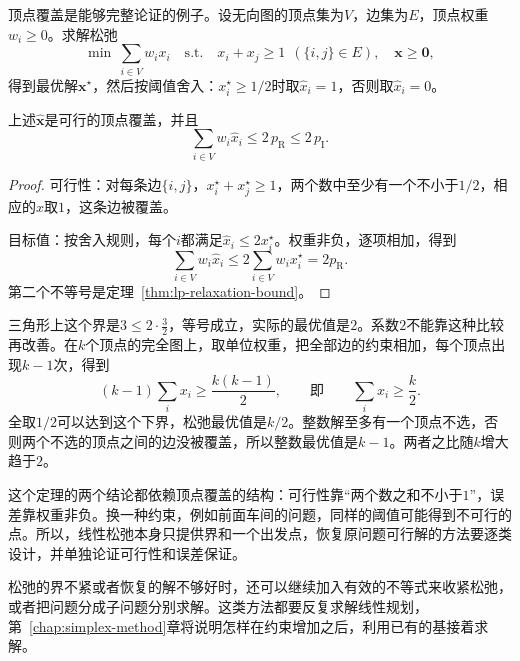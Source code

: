顶点覆盖是能够完整论证的例子。设无向图的顶点集为$V$，边集为$E$，顶点权重$w_i\geq0$。求解松弛
\[
 \min\ \sum_{i\in V}w_ix_i\quad\text{s.t.}\quad x_i+x_j\geq1\ \ (\{i,j\}\in E),\quad\bm{x}\geq\bm{0},
\]
得到最优解$\bm{x}^\star$，然后按阈值舍入：$x_i^\star\geq1/2$时取$\widehat{x}_i=1$，否则取$\widehat{x}_i=0$。

\begin{theorem}[顶点覆盖的阈值舍入]
 \label{thm:lp-cover-rounding}
 上述$\widehat{\bm{x}}$是可行的顶点覆盖，并且
 \begin{equation}
  \sum_{i\in V}w_i\widehat{x}_i\leq2\,p_{\mathrm{R}}\leq2\,p_{\mathrm{I}}.
  \label{eq:lp-cover-rounding}
 \end{equation}
\end{theorem}

\begin{proof}
 可行性：对每条边$\{i,j\}$，$x_i^\star+x_j^\star\geq1$，两个数中至少有一个不小于$1/2$，相应的$\widehat{x}$取$1$，这条边被覆盖。

 目标值：按舍入规则，每个$i$都满足$\widehat{x}_i\leq2x_i^\star$。权重非负，逐项相加，得到
 \[
  \sum_{i\in V}w_i\widehat{x}_i\leq2\sum_{i\in V}w_ix_i^\star=2p_{\mathrm{R}}.
 \]
 第二个不等号是定理~\ref{thm:lp-relaxation-bound}。
\end{proof}

三角形上这个界是$3\leq2\cdot\frac32$，等号成立，实际的最优值是$2$。系数$2$不能靠这种比较再改善。在$k$个顶点的完全图上，取单位权重，把全部边的约束相加，每个顶点出现$k-1$次，得到
\[
 (k-1)\sum_ix_i\geq\frac{k(k-1)}{2},\qquad\text{即}\qquad\sum_ix_i\geq\frac{k}{2}.
\]
全取$1/2$可以达到这个下界，松弛最优值是$k/2$。整数解至多有一个顶点不选，否则两个不选的顶点之间的边没被覆盖，所以整数最优值是$k-1$。两者之比随$k$增大趋于$2$。

这个定理的两个结论都依赖顶点覆盖的结构：可行性靠“两个数之和不小于$1$”，误差靠权重非负。换一种约束，例如前面车间的问题，同样的阈值可能得到不可行的点。所以，线性松弛本身只提供界和一个出发点，恢复原问题可行解的方法要逐类设计，并单独论证可行性和误差保证。

松弛的界不紧或者恢复的解不够好时，还可以继续加入有效的不等式来收紧松弛，或者把问题分成子问题分别求解。这类方法都要反复求解线性规划，第~\ref{chap:simplex-method}章将说明怎样在约束增加之后，利用已有的基接着求解。
